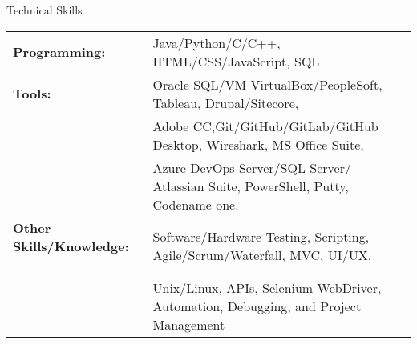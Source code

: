 \documentclass{resume} %
\begin{document}
\begin{rSection}{Technical Skills}

\begin{tabular}{ @{} >{\bfseries}l @{\hspace{6ex}} l }
Programming: \ & Java/Python/C/C++, HTML/CSS/JavaScript, SQL \\

\textbf{Tools:} \ & Oracle SQL/VM VirtualBox/PeopleSoft, Tableau, Drupal/Sitecore, \\
\ & Adobe CC,Git/GitHub/GitLab/GitHub Desktop, Wireshark, MS Office Suite, \\
\ & Azure DevOps Server/SQL Server/ Atlassian Suite, PowerShell, Putty, Codename one.  \\

\textbf{Other Skills/Knowledge:} \ & Software/Hardware Testing, Scripting, Agile/Scrum/Waterfall, MVC, UI/UX, \\
\ & Unix/Linux, APIs, Selenium WebDriver, Automation, Debugging, and Project Management

\end{tabular}

\end{rSection}
\end{document}
